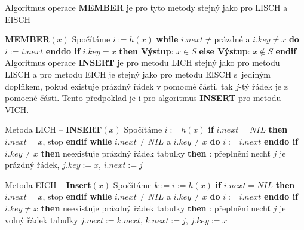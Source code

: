 \documentclass[a4paper,12pt]{article}
\begin{document}
Algoritmus operace {\bf MEMBER} je pro tyto metody 
stejný jako pro LISCH a EISCH


{\bf MEMBER$(x)$}\newline 
Spočítáme $i:=h(x)$\newline 
{\bf while} $i.next\ne$prázdné a $i.key\ne x$ {\bf do} $i:=i.
next$ {\bf enddo\newline 
if} $i.key=x$ {\bf then Výstup}: $x\in S$ {\bf else Výstup}: $
x\notin S$ {\bf endif
}
Algoritmus operace {\bf INSERT} je pro metodu LICH stejný 
jako pro metodu LISCH a pro metodu EICH je stejný jako 
pro metodu EISCH s~jediným doplňkem, pokud existuje 
prázdný řádek v pomocné části, tak $j$-tý řádek je z 
pomocné části. Tento předpoklad je i pro algoritmus 
{\bf INSERT} pro metodu VICH.


Metoda LICH -- {\bf INSERT$(x)$}\newline 
Spočítáme $i:=h(x)$\newline 
{\bf if} $i.next=NIL$ {\bf then} $i.next=x$, stop {\bf endif\newline 
while} $i.next\ne NIL$ a $i.key\ne x$ {\bf do} $i:=i.next$ {\bf enddo\newline 
if} $i.key\ne x$ {\bf then}\newline 
\phantom{---}{\bf if} neexistuje prázdný řádek tabulky {\bf then}\newline 
\phantom{------}{\bf Výstup}: přeplnění\newline 
\phantom{---}{\bf else}\newline 
\phantom{------}nechť $j$ je prázdný řádek, $j
.key:=x$, $i.next:=j$\newline 
\phantom{---}{\bf endif\newline 
endif}


Metoda EICH -- {\bf Insert$(x)$}\newline 
Spočítáme $k:=i:=h(x)$\newline 
{\bf if} $i.next=NIL$ {\bf then} $i.next=x$, stop {\bf endif\newline 
while} $i.next\ne NIL$ a $i.key\ne x$ {\bf do} $i:=i.next$ {\bf enddo\newline 
if} $i.key\ne x$ {\bf then}\newline 
\phantom{---}{\bf if} neexistuje prázdný řádek tabulky {\bf then}\newline 
\phantom{------}{\bf Výstup}: přeplnění\newline 
\phantom{---}{\bf else}\newline 
\phantom{------}nechť $j$ je volný řádek tabulky\newline 
\phantom{------}$j.next:=k.next$, $k.next:=j$, $j.key:=x$\newline 
\phantom{---}{\bf endif\newline 
endif}
\end{document}
